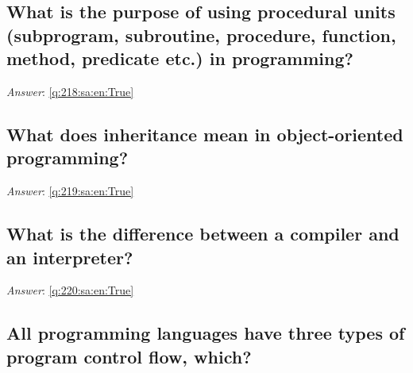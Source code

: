 \documentclass[a4paper,11pt,oneside]{article}
\begin{document}
\begin{sloppypar}
\subsection{What is the purpose of using procedural units (subprogram, subroutine, procedure, function, method, predicate etc.) in programming?}

\label{q:218:sa:en:False}

\vspace{2cm}

\noindent\makebox[\textwidth]{\hrulefill}

\vspace{1cm}

\textit{Answer}: \autoref{q:218:sa:en:True}



\subsection{What does inheritance mean in object-oriented programming?}

\label{q:219:sa:en:False}

\vspace{2cm}

\noindent\makebox[\textwidth]{\hrulefill}

\vspace{1cm}

\textit{Answer}: \autoref{q:219:sa:en:True}



\subsection{What is the difference between a compiler and an interpreter?}

\label{q:220:sa:en:False}

\vspace{2cm}

\noindent\makebox[\textwidth]{\hrulefill}

\vspace{1cm}

\textit{Answer}: \autoref{q:220:sa:en:True}



\subsection{All programming languages have three types of program control flow, which?}

\label{q:221:sa:en:False}


\end{sloppypar}
\end{document}
